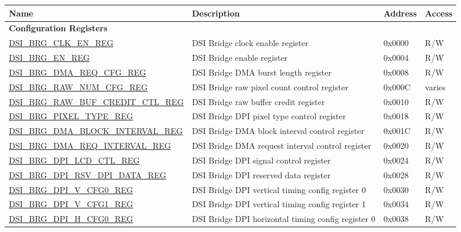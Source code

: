 \begin{longtable}{ | p{6.8cm} | p{7.2cm} | p{1.3cm} | p{1cm} | }
\hline\rowcolor{lightgray}
Name & Description &  Address & Access \\ \hline
\endhead

\multicolumn{4}{|l|}{\textbf{Configuration Registers}} \\ \hline
\hyperref[regdesc:DSIBRGCLKENREG]{DSI\_BRG\_CLK\_EN\_REG} & DSI Bridge clock enable register & 0x0000 & R/W \\ \hline
\hyperref[regdesc:DSIBRGENREG]{DSI\_BRG\_EN\_REG} & DSI Bridge enable register & 0x0004 & R/W \\ \hline
\hyperref[regdesc:DSIBRGDMAREQCFGREG]{DSI\_BRG\_DMA\_REQ\_CFG\_REG} & DSI Bridge DMA burst length register & 0x0008 & R/W \\ \hline
\hyperref[regdesc:DSIBRGRAWNUMCFGREG]{DSI\_BRG\_RAW\_NUM\_CFG\_REG} & DSI Bridge raw pixel count control register & 0x000C & varies \\ \hline
\hyperref[regdesc:DSIBRGRAWBUFCREDITCTLREG]{DSI\_BRG\_RAW\_BUF\_CREDIT\_CTL\_REG} & DSI Bridge raw buffer credit register & 0x0010 & R/W \\ \hline
\hyperref[regdesc:DSIBRGPIXELTYPEREG]{DSI\_BRG\_PIXEL\_TYPE\_REG} & DSI Bridge DPI pixel type control register & 0x0018 & R/W \\ \hline
\hyperref[regdesc:DSIBRGDMABLOCKINTERVALREG]{DSI\_BRG\_DMA\_BLOCK\_INTERVAL\_REG} & DSI Bridge DMA block interval control register & 0x001C & R/W \\ \hline
\hyperref[regdesc:DSIBRGDMAREQINTERVALREG]{DSI\_BRG\_DMA\_REQ\_INTERVAL\_REG} & DSI Bridge DMA request interval control register & 0x0020 & R/W \\ \hline
\hyperref[regdesc:DSIBRGDPILCDCTLREG]{DSI\_BRG\_DPI\_LCD\_CTL\_REG} & DSI Bridge DPI signal control register & 0x0024 & R/W \\ \hline
\hyperref[regdesc:DSIBRGDPIRSVDPIDATAREG]{DSI\_BRG\_DPI\_RSV\_DPI\_DATA\_REG} & DSI Bridge DPI reserved data register & 0x0028 & R/W \\ \hline
\hyperref[regdesc:DSIBRGDPIVCFG0REG]{DSI\_BRG\_DPI\_V\_CFG0\_REG} & DSI Bridge DPI vertical timing config register 0 & 0x0030 & R/W \\ \hline
\hyperref[regdesc:DSIBRGDPIVCFG1REG]{DSI\_BRG\_DPI\_V\_CFG1\_REG} & DSI Bridge DPI vertical timing config register 1 & 0x0034 & R/W \\ \hline
\hyperref[regdesc:DSIBRGDPIHCFG0REG]{DSI\_BRG\_DPI\_H\_CFG0\_REG} & DSI Bridge DPI horizontal timing config register 0 & 0x0038 & R/W \\ \hline

\end{longtable}
